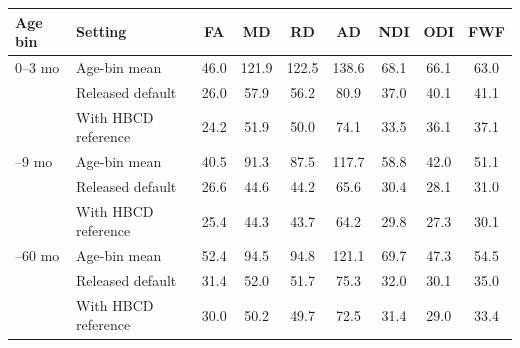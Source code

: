 \begin{tabular}{llccccccc}
\toprule
Age bin & Setting & FA & MD & RD & AD & NDI & ODI & FWF \\
\midrule
0--3 mo & Age-bin mean & 46.0 & 121.9 & 122.5 & 138.6 & 68.1 & 66.1 & 63.0 \\
 & Released default & 26.0 & 57.9 & 56.2 & 80.9 & 37.0 & 40.1 & 41.1 \\
 & With HBCD reference & 24.2 & 51.9 & 50.0 & 74.1 & 33.5 & 36.1 & 37.1 \\
\addlinespace[2pt]
4--9 mo & Age-bin mean & 40.5 & 91.3 & 87.5 & 117.7 & 58.8 & 42.0 & 51.1 \\
 & Released default & 26.6 & 44.6 & 44.2 & 65.6 & 30.4 & 28.1 & 31.0 \\
 & With HBCD reference & 25.4 & 44.3 & 43.7 & 64.2 & 29.8 & 27.3 & 30.1 \\
\addlinespace[2pt]
10--60 mo & Age-bin mean & 52.4 & 94.5 & 94.8 & 121.1 & 69.7 & 47.3 & 54.5 \\
 & Released default & 31.4 & 52.0 & 51.7 & 75.3 & 32.0 & 30.1 & 35.0 \\
 & With HBCD reference & 30.0 & 50.2 & 49.7 & 72.5 & 31.4 & 29.0 & 33.4 \\
\bottomrule
\end{tabular}
